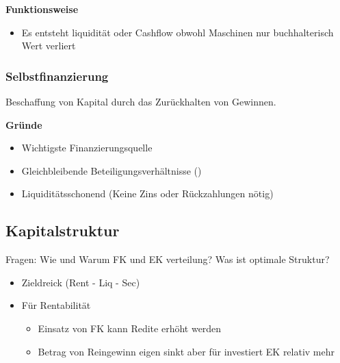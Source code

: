 \textbf{Funktionsweise}
\begin{itemize}
    \item Es entsteht liquidität oder Cashflow obwohl Maschinen nur buchhalterisch Wert verliert

\end{itemize}

\subsubsection{Selbstfinanzierung}
\begin{definition}
    [Selbstfinanzierung] Beschaffung von Kapital durch das Zurückhalten von Gewinnen.
\end{definition}

\textbf{Gründe}
\begin{itemize}
    \item Wichtigste Finanzierungsquelle
    \item Gleichbleibende Beteiligungsverhältnisse ()
    \item Liquiditätsschonend (Keine Zins oder Rückzahlungen nötig)
\end{itemize}
\subsection{Kapitalstruktur}
Fragen: Wie und Warum FK und EK verteilung? Was ist optimale Struktur?

\begin{itemize}
    \item Zieldreick (Rent - Liq - Sec)
    \item Für Rentabilität
    \begin{itemize}
        \item Einsatz von FK kann Redite erhöht werden
        \item Betrag von Reingewinn eigen sinkt aber für investiert EK relativ mehr
    \end{itemize}
\end{itemize}


